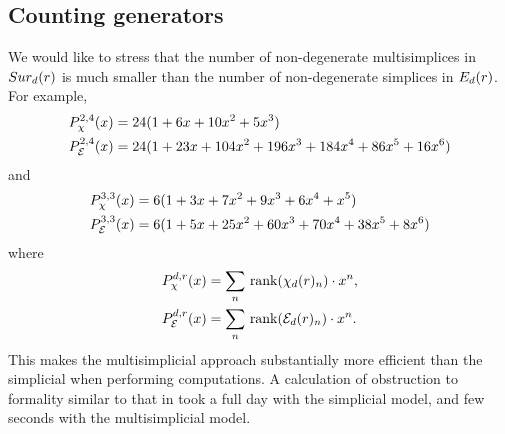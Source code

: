
\subsection{Counting generators}

We would like to stress that the number of non-degenerate multisimplices in $Sur_d(r)$ is much smaller than the number of non-degenerate simplices in $E_d(r)$.
For example,
\begin{align*}
	& P_\chi^{2,4}(x) = 24(1+6x+10x^2+5x^3) \\
	& P_{\mathcal{E}}^{2,4}(x) = 24(1+23x+104x^2+196x^3+184x^4+86x^5+16x^6)
\end{align*}
and
\begin{align*}
	& P_\chi^{3,3}(x) = 6(1+3x+7x^2+9x^3+6x^4+x^5) \\
	& P_{\mathcal{E}}^{3,3}(x) = 6(1+5x+25x^2+60x^3+70x^4+38x^5+8x^6 )
\end{align*}
where
\begin{align*}
	P_\chi^{d,r}(x) &= \sum_n \,\operatorname{rank}(\chi_d(r)_n) \cdot x^n, \\
	P_{\mathcal{E}}^{d,r}(x)  &= \sum_n \,\operatorname{rank}(\mathcal{E}_d(r)_n)  \cdot x^n.
\end{align*}
This makes the multisimplicial approach substantially more efficient than the simplicial
when performing computations. 
A calculation of obstruction to formality similar to that in
\cite{salvatore2020planarnonformality} took a full day with the simplicial model, and few seconds with the multisimplicial model.
